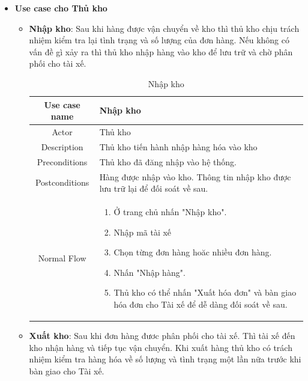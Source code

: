 \begin{itemize}
\begin{itemize}
	\end{itemize}


	\item \textbf{Use case cho Thủ kho}
	
	\begin{itemize}
		\item \textbf{Nhập kho}: Sau khi hàng được vận chuyển về kho thì thủ kho chịu trách nhiệm kiểm tra lại tình trạng và số lượng của đơn hàng. Nếu không có vấn đề gì xảy ra thì thủ kho nhập hàng vào kho để lưu trữ và chờ phân phối cho tài xế.
		
		\begin{table}[H]
			\centering\begin{tabular}{|c|m{25em}|}
				\hline 
				Use case name & Nhập kho\\ 
				\hline 
				Actor & Thủ kho \\ 
				\hline
				Description & Thủ kho tiến hành nhập hàng hóa vào kho \\
				\hline 
				Preconditions & Thủ kho đã đăng nhập vào hệ thống. \\
				\hline
				Postconditions & Hàng được nhập vào kho. Thông tin nhập kho được lưu trữ lại để đối soát về sau. \\
				\hline
				Normal Flow & \begin{enumerate}
					\item Ở trang chủ nhấn "Nhập kho".
					\item Nhập mã tài xế
					\item Chọn từng đơn hàng hoăc nhiều đơn hàng.
					\item Nhấn "Nhập hàng".
					\item Thủ kho có thể nhấn "Xuất hóa đơn" và bàn giao hóa đơn cho Tài xế để dễ dàng đối soát về sau.
				\end{enumerate}
				\\
				\hline
			\end{tabular}
			\caption{Nhập kho}
		\end{table}
	
		\item \textbf{Xuất kho}: Sau khi đơn hàng đươc phân phối cho tài xế. Thì tài xế đến kho nhận hàng và tiếp tục vận chuyển. Khi xuất hàng thủ kho có trách nhiệm kiểm tra hàng hóa về số lượng và tình trạng một lần nữa trước khi bàn giao cho Tài xế.
		

\end{itemize}
\end{itemize}
